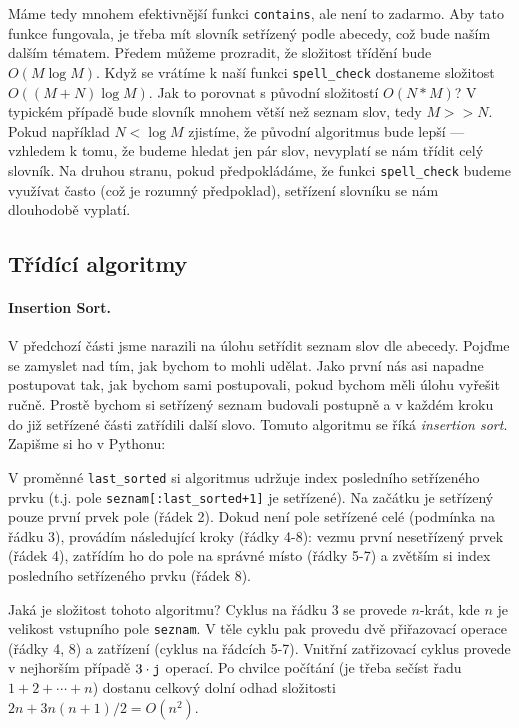 Máme tedy mnohem efektivnější funkci {\tt contains}, ale není to zadarmo. Aby tato funkce fungovala, je třeba mít slovník setřízený podle abecedy, což bude naším dalším tématem.
Předem můžeme prozradit, že složitost třídění bude $O(M\log M)$. Když se vrátíme k naší funkci {\tt spell\_check} dostaneme složitost $O((M+N)\log M)$. Jak to porovnat
s původní složitostí $O(N*M)$? V typickém případě bude slovník mnohem větší než seznam slov, tedy $M>>N$. Pokud například $N<\log M$ zjistíme, že původní algoritmus
bude lepší --- vzhledem k tomu, že budeme hledat jen pár slov, nevyplatí se nám třídit celý slovník. Na druhou stranu, pokud předpokládáme, že funkci {\tt spell\_check}
budeme využívat často (což je rozumný předpoklad), setřízení slovníku se nám dlouhodobě vyplatí. 

\subsection*{Třídící algoritmy} 
\paragraph{Insertion Sort.} 
V předchozí části jsme narazili na úlohu setřídit seznam slov dle abecedy. Pojďme se zamyslet nad tím, jak bychom to mohli udělat. Jako první nás asi napadne postupovat
tak, jak bychom sami postupovali, pokud bychom měli úlohu vyřešit ručně. Prostě bychom si setřízený seznam budovali postupně a v každém kroku do již setřízené části
zatřídili další slovo. Tomuto algoritmu se říká \emph{insertion sort}. Zapišme si ho v Pythonu:


V proměnné {\tt last\_sorted} si algoritmus udržuje index posledního setřízeného prvku (t.j. pole {\tt seznam[:last\_sorted+1]} je setřízené).
Na začátku je setřízený pouze první prvek pole (řádek 2). Dokud není pole setřízené celé (podmínka na řádku 3), provádím následující kroky (řádky 4-8):
vezmu první nesetřízený prvek (řádek 4), zatřídím ho do pole na správné místo (řádky 5-7) a zvětším si index posledního setřízeného prvku (řádek 8).

Jaká je složitost tohoto algoritmu? Cyklus na řádku 3 se provede $n$-krát, kde $n$ je velikost vstupního pole {\tt seznam}. V těle cyklu pak provedu
dvě přiřazovací operace (řádky 4, 8) a zatřízení (cyklus na řádcích 5-7). Vnitřní zatřizovací cyklus provede v nejhorším případě $3\cdot {\tt j}$ operací.
Po chvilce počítání (je třeba sečíst řadu $1 + 2 + \cdots + n$) dostanu celkový dolní odhad složitosti $2n + 3n(n+1)/2 = O(n^2)$.

